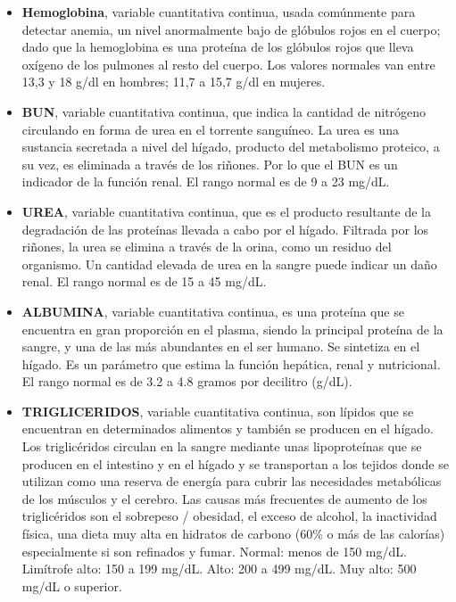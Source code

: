 \documentclass[runningheads,a4paper]{llncs}
\begin{document}
\begin{itemize}
\item \textbf{Hemoglobina}, variable cuantitativa continua, usada comúnmente para detectar anemia, un nivel anormalmente bajo de glóbulos rojos en el cuerpo; dado que la hemoglobina es una proteína de los glóbulos rojos que lleva oxígeno de los pulmones al resto del cuerpo. Los valores normales van entre 13,3 y 18 g/dl en hombres; 11,7 a 15,7 g/dl en mujeres.


\item \textbf{\ac{BUN}}, variable cuantitativa continua, que indica  la cantidad de nitrógeno circulando en forma de urea en el torrente sanguíneo. La urea es una sustancia secretada a nivel del hígado, producto del metabolismo proteico, a su vez, es eliminada a través de los riñones. Por lo que el BUN es un indicador de la función renal. El rango normal es de 9 a 23 mg/dL.

\item \textbf{UREA}, variable cuantitativa continua, que  es el producto resultante de la degradación de las proteínas llevada a cabo por el hígado. Filtrada por los riñones, la urea se elimina a través de la orina, como un residuo del organismo. Un cantidad elevada de urea en la sangre puede indicar un daño renal. El rango normal es de 15 a 45 mg/dL.

\item \textbf{ALBUMINA}, variable cuantitativa continua, es una proteína que se encuentra en gran proporción en el plasma, siendo la principal proteína de la sangre, y una de las más abundantes en el ser humano. Se sintetiza en el hígado. Es un parámetro que estima la función hepática, renal y nutricional. El rango normal es de 3.2 a 4.8 gramos por decilitro (g/dL).

\item \textbf{TRIGLICERIDOS}, variable cuantitativa continua, son lípidos que se encuentran en determinados alimentos y también se producen en el hígado. Los triglicéridos circulan en la sangre mediante unas lipoproteínas que se producen en el intestino y en el hígado y se transportan a los tejidos donde se utilizan como una reserva de energía para cubrir las necesidades metabólicas de los músculos y el cerebro. Las causas más frecuentes de aumento de los triglicéridos son el sobrepeso / obesidad, el exceso de alcohol, la inactividad física, una dieta muy alta en hidratos de carbono (60\% o más de las calorías) especialmente si son refinados y fumar.  Normal: menos de 150 mg/dL. Limítrofe alto: 150 a 199 mg/dL. Alto: 200 a 499 mg/dL. Muy alto: 500 mg/dL o superior.


\end{itemize}
\end{document}
